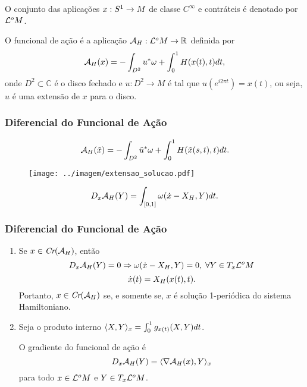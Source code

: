 \documentclass{beamer}
\begin{document}
\begin{footnotesize}
\begin{frame}
		O conjunto das aplicações $x:S^{1} \to M$ de classe $C^{\infty}$ e contráteis é denotado por $\mathcal{L}^{o}M$.
		
		\begin{definicao}
			O funcional de ação é a aplicação $\mathcal{A}_{H}: \mathcal{L}^{o}M\to \mathbb{R}^{}$ definida por
			$$
			\mathcal{A}_{H}(x) = -\int_{D^{2}}u^{*}\omega + \int_{0}^{1}H(x(t), t)dt,
			$$
			onde $D^{2} \subset \mathbb{C}$ é o disco fechado e $u:D^{2}\to M$ é tal que $u(e^{i2\pi t})=x(t)$, ou seja, $u$ é uma extensão de $x$ para o disco.
			
		\end{definicao}
	\end{frame}
	
	\begin{frame}
		\frametitle{Diferencial do Funcional de Ação}
			$$
			\mathcal{A}_{H}(\tilde{x}) = -\int_{D^{2}}\tilde{u}^{*}\omega + \int_{0}^{1}H(\tilde{x}(s,t),t)dt.
			$$
				\begin{figure}[!h]
					\centering
					\texttt{[image: ../imagem/extensao\_solucao.pdf]}
					
				\end{figure}
		\begin{proposicao}
			$$
		D_{x}\mathcal{A}_{H}(Y) = \int_{[0,1]} \omega(\dot{x} - X_{H}, Y)dt.
		$$
		\end{proposicao}
		
	\end{frame}
	
	\begin{frame}
				\frametitle{Diferencial do Funcional de Ação}
		\begin{enumerate}
			\item 	Se $x \in \textit{Cr}(\mathcal{A}_{H})$, então
			$$
			D_{x}\mathcal{A}_{H}(Y) = 0 \Rightarrow \omega(\dot{x} - X_{H}, Y)=0,\; \forall Y \in T_{x}\mathcal{L}^{o}M
			$$
			$$
			\dot{x}(t) =X_{H}(x(t), t).
			$$
			Portanto, $x \in \textit{Cr}(\mathcal{A}_{H})$ se, e somente se, $x$ é solução 1-periódica do sistema Hamiltoniano. 
			
			\item Seja o produto interno $ \langle X, Y \rangle_{x} = \int_{0}^{1}g_{x(t)}(X, Y)dt$. 
			
			O gradiente do funcional de ação é 
			$$
			D_{x}\mathcal{A}_{H}(Y) = \langle \nabla \mathcal{A}_{H}(x), Y \rangle_{x}
			$$
			para todo $x \in \mathcal{L}^{o}M$ e $Y \in T_{x}\mathcal{L}^{o}M$.
		\end{enumerate}
		

\end{frame}
\end{footnotesize}
\end{document}
